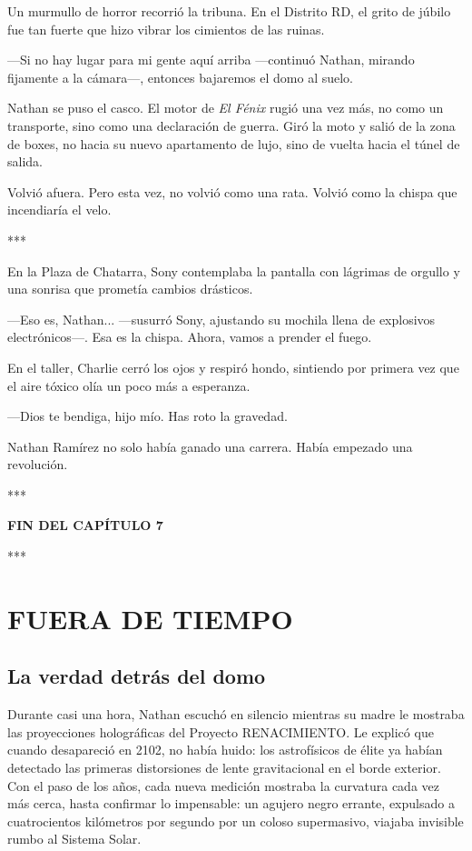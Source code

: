 \documentclass[11pt,twoside]{book}
\begin{document}
Un murmullo de horror recorrió la tribuna. En el Distrito RD, el grito de júbilo fue tan fuerte que hizo vibrar los cimientos de las ruinas.

---Si no hay lugar para mi gente aquí arriba ---continuó Nathan, mirando fijamente a la cámara---, entonces bajaremos el domo al suelo.

Nathan se puso el casco. El motor de \textit{El Fénix} rugió una vez más, no como un transporte, sino como una declaración de guerra. Giró la moto y salió de la zona de boxes, no hacia su nuevo apartamento de lujo, sino de vuelta hacia el túnel de salida.

Volvió afuera. Pero esta vez, no volvió como una rata. Volvió como la chispa que incendiaría el velo.

\bigskip
\begin{center}***\end{center}
\bigskip

En la Plaza de Chatarra, Sony contemplaba la pantalla con lágrimas de orgullo y una sonrisa que prometía cambios drásticos.

---Eso es, Nathan... ---susurró Sony, ajustando su mochila llena de explosivos electrónicos---. Esa es la chispa. Ahora, vamos a prender el fuego.

En el taller, Charlie cerró los ojos y respiró hondo, sintiendo por primera vez que el aire tóxico olía un poco más a esperanza.

---Dios te bendiga, hijo mío. Has roto la gravedad.

Nathan Ramírez no solo había ganado una carrera. Había empezado una revolución.

\bigskip
\begin{center}***\end{center}
\bigskip

\textbf{FIN DEL CAPÍTULO 7}


\bigskip
\begin{center}***\end{center}
\bigskip

\chapter{FUERA DE TIEMPO}

\section*{La verdad detrás del domo}

Durante casi una hora, Nathan escuchó en silencio mientras su madre le mostraba las proyecciones holográficas del Proyecto RENACIMIENTO. Le explicó que cuando desapareció en 2102, no había huido: los astrofísicos de élite ya habían detectado las primeras distorsiones de lente gravitacional en el borde exterior. Con el paso de los años, cada nueva medición mostraba la curvatura cada vez más cerca, hasta confirmar lo impensable: un agujero negro errante, expulsado a cuatrocientos kilómetros por segundo por un coloso supermasivo, viajaba invisible rumbo al Sistema Solar.
\end{document}
